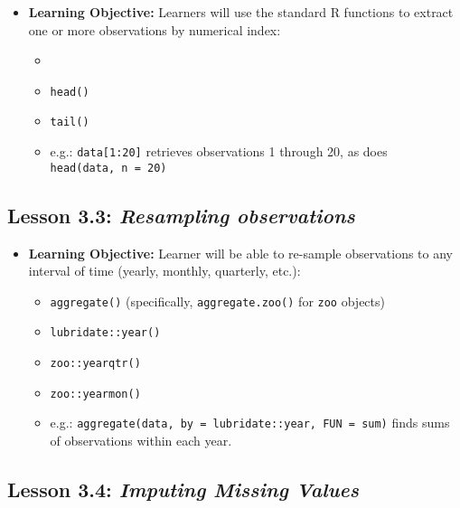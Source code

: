 \documentclass[
]{book}
\providecommand{\tightlist}{%
  \setlength{\itemsep}{0pt}\setlength{\parskip}{0pt}}
\begin{document}
\begin{itemize}
\tightlist
\item
  \textbf{Learning Objective:} Learners will use the standard R functions to extract one or more observations by numerical index:

  \begin{itemize}
  \tightlist
  \item
    \texttt{\textquotesingle{}{[}\textquotesingle{}}
  \item
    \texttt{head()}
  \item
    \texttt{tail()}
  \item
    e.g.: \texttt{data{[}1:20{]}} retrieves observations 1 through 20, as does \texttt{head(data,\ n\ =\ 20)}
  \end{itemize}
\end{itemize}

\hypertarget{lesson-3.3-resampling-observations}{%
\subsection*{\texorpdfstring{Lesson 3.3: \emph{Resampling observations}}{Lesson 3.3: Resampling observations}}\label{lesson-3.3-resampling-observations}}

\begin{itemize}
\tightlist
\item
  \textbf{Learning Objective:} Learner will be able to re-sample observations to any interval of time (yearly, monthly, quarterly, etc.):

  \begin{itemize}
  \tightlist
  \item
    \texttt{aggregate()} (specifically, \texttt{aggregate.zoo()} for \texttt{zoo} objects)
  \item
    \texttt{lubridate::year()}
  \item
    \texttt{zoo::yearqtr()}
  \item
    \texttt{zoo::yearmon()}
  \item
    e.g.: \texttt{aggregate(data,\ by\ =\ lubridate::year,\ FUN\ =\ sum)} finds sums of observations within each year.
  \end{itemize}
\end{itemize}

\hypertarget{lesson-3.4-imputing-missing-values}{%
\subsection*{\texorpdfstring{Lesson 3.4: \emph{Imputing Missing Values}}{Lesson 3.4: Imputing Missing Values}}\label{lesson-3.4-imputing-missing-values}}
\end{document}
